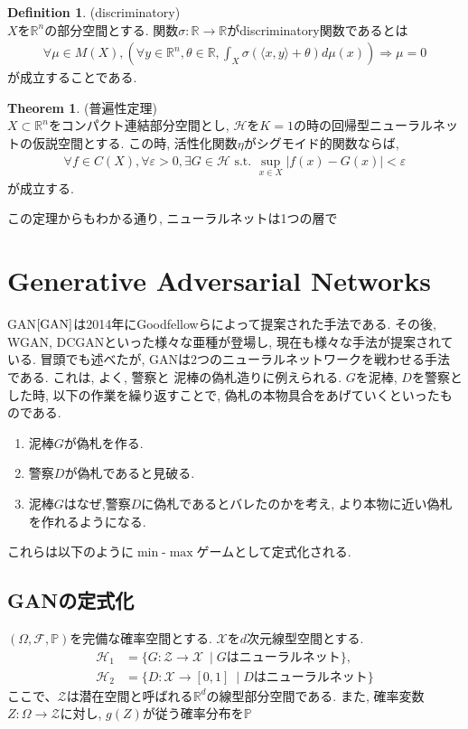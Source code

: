 \documentclass[11pt, a4paper, dvipdfmx]{jsarticle}
\theoremstyle{definition}
\newtheorem{Definition+}[Axiom+]{Definition}
\newtheorem{Theorem+}[Axiom+]{Theorem}
\newcommand{\R}{\mathbb{R}}
\newcommand{\F}{\mathcal{F}}
\newcommand{\X}{\mathcal{X}}
\newcommand{\Hil}{\mathcal{H}}
\newcommand{\e}{\varepsilon}
\renewcommand{\P}{\mathbb{P}}
\newcommand{\Probsp}{(\Omega, \F, \P)}
\def\inner<#1>{\langle #1 \rangle}
\begin{document}
\begin{Definition+}(discriminatory)\\
    $X$を$\R^n$の部分空間とする. 関数$\sigma:\R\to\R$がdiscriminatory関数であるとは
    \begin{align*}
        \forall\mu\in M(X), \left(\forall y\in\R^n, \theta\in\R, \int_{X}\sigma(\inner<x, y> + \theta)d\mu(x)\right)\Longrightarrow\mu = 0
    \end{align*}
    が成立することである. 
\end{Definition+}
\begin{Theorem+}(普遍性定理)\\
    $X\subset\R^n$をコンパクト連結部分空間とし, $\Hil$を$K = 1$の時の回帰型ニューラルネットの仮説空間とする. 
    この時, 活性化関数$\eta$がシグモイド的関数ならば, 
    \begin{align*}
        \forall f\in C(X), \forall\e> 0, \exists G\in\Hil\text{ s.t. } \sup_{x\in X}|f(x) - G(x)| < \e
    \end{align*}
    が成立する. 
\end{Theorem+}
この定理からもわかる通り, ニューラルネットは1つの層で
\section{Generative Adversarial Networks}
GAN$\cite{GAN}$は2014年にGoodfellowらによって提案された手法である. 
その後, WGAN, DCGANといった様々な亜種が登場し, 現在も様々な手法が提案されている.
冒頭でも述べたが, GANは2つのニューラルネットワークを戦わせる手法である. これは, よく, 警察と
泥棒の偽札造りに例えられる. $G$を泥棒, $D$を警察とした時, 以下の作業を繰り返すことで, 偽札の本物具合をあげていくといったものである.
\begin{enumerate}
    \item 泥棒$G$が偽札を作る.
    \item 警察$D$が偽札であると見破る.
    \item 泥棒$G$はなぜ,警察$D$に偽札であるとバレたのかを考え, より本物に近い偽札を作れるようになる.
\end{enumerate}
これらは以下のように$\min$-$\max$ゲームとして定式化される.
\subsection{GANの定式化}
$\Probsp$を完備な確率空間とする.  
$\X$を$d$次元線型空間とする. 
\begin{align*}
    \Hil_1 &= \{G:\mathcal{Z}\to\X~\mid G\text{はニューラルネット}\},\\
    \Hil_{2} &= \{D:\X\to [0, 1]~\mid D\text{はニューラルネット}\}
\end{align*}
ここで、$\mathcal{Z}$は潜在空間と呼ばれる$\R^{d}$の線型部分空間である.
また, 確率変数$Z:\Omega\to\mathcal{Z}$に対し, $g(Z)$が従う確率分布を$\mathbb{P}_{}$
\end{document}
